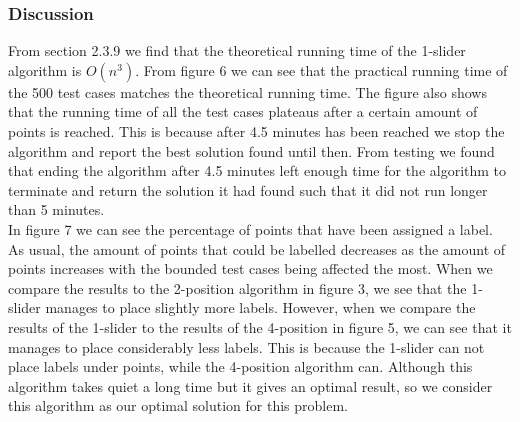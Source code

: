 \documentclass[crop=false,a4paper,oneside,11pt]{standalone}
\begin{document}
\subsubsection{Discussion}
From section 2.3.9 we find that the theoretical running time of the 1-slider algorithm is $O(n^3)$. From figure 6 we can see that the practical running time of the 500 test cases matches the theoretical running time. The figure also shows that the running time of all the test cases plateaus after a certain amount of points is reached. This is because after 4.5 minutes has been reached we stop the algorithm and report the best solution found until then. From testing we found that ending the algorithm after 4.5 minutes left enough time for the algorithm to terminate and return the solution it had found such that it did not run longer than 5 minutes.\\
In figure 7 we can see the percentage of points that have been assigned a label. As usual, the amount of points that could be labelled decreases as the amount of points increases with the bounded test cases being affected the most. When we compare the results to the 2-position algorithm in figure 3, we see that the 1-slider manages to place slightly more labels. However, when we compare the results of the 1-slider to the results of the 4-position in figure 5, we can see that it manages to place considerably less labels. This is because the 1-slider can not place labels under points, while the 4-position algorithm can.
Although this algorithm takes quiet a long time but it gives an optimal result, so we consider this algorithm as our optimal solution for this problem.\\
\end{document}
